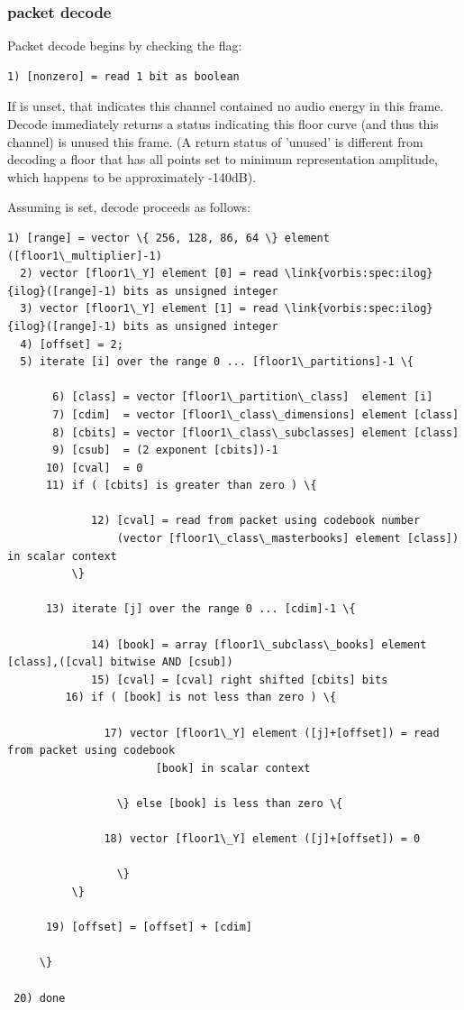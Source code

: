 \subsubsection{packet decode} \label{vorbis:spec:floor1-decode}

Packet decode begins by checking the \varname{[nonzero]} flag:

\begin{Verbatim}[commandchars=\\\{\}]
  1) [nonzero] = read 1 bit as boolean
\end{Verbatim}

If \varname{[nonzero]} is unset, that indicates this channel contained
no audio energy in this frame.  Decode immediately returns a status
indicating this floor curve (and thus this channel) is unused this
frame.  (A return status of 'unused' is different from decoding a
floor that has all points set to minimum representation amplitude,
which happens to be approximately -140dB).


Assuming \varname{[nonzero]} is set, decode proceeds as follows:

\begin{Verbatim}[commandchars=\\\{\}]
  1) [range] = vector \{ 256, 128, 86, 64 \} element ([floor1\_multiplier]-1)
  2) vector [floor1\_Y] element [0] = read \link{vorbis:spec:ilog}{ilog}([range]-1) bits as unsigned integer
  3) vector [floor1\_Y] element [1] = read \link{vorbis:spec:ilog}{ilog}([range]-1) bits as unsigned integer
  4) [offset] = 2;
  5) iterate [i] over the range 0 ... [floor1\_partitions]-1 \{

       6) [class] = vector [floor1\_partition\_class]  element [i]
       7) [cdim]  = vector [floor1\_class\_dimensions] element [class]
       8) [cbits] = vector [floor1\_class\_subclasses] element [class]
       9) [csub]  = (2 exponent [cbits])-1
      10) [cval]  = 0
      11) if ( [cbits] is greater than zero ) \{

             12) [cval] = read from packet using codebook number
                 (vector [floor1\_class\_masterbooks] element [class]) in scalar context
          \}

      13) iterate [j] over the range 0 ... [cdim]-1 \{

             14) [book] = array [floor1\_subclass\_books] element [class],([cval] bitwise AND [csub])
             15) [cval] = [cval] right shifted [cbits] bits
	     16) if ( [book] is not less than zero ) \{

	           17) vector [floor1\_Y] element ([j]+[offset]) = read from packet using codebook
                       [book] in scalar context

                 \} else [book] is less than zero \{

	           18) vector [floor1\_Y] element ([j]+[offset]) = 0

                 \}
          \}

      19) [offset] = [offset] + [cdim]

     \}

 20) done
\end{Verbatim}

